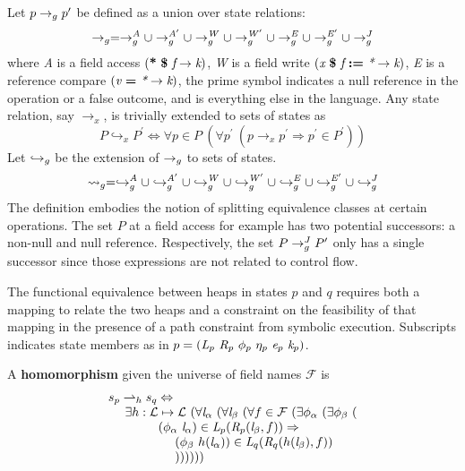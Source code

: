 Let $p \rightarrow_{g} p^\prime$ be defined as a union over state relations:
$$
\rightarrow_{g} = \rightarrow_{g}^\mathit{A} \cup  \rightarrow_{g}^\mathit{A^\prime} \cup \rightarrow_{g}^\mathit{W} \cup \rightarrow_{g}^\mathit{W^\prime} \cup \rightarrow_{g}^\mathit{E} \cup \rightarrow_{g}^\mathit{E^\prime} \cup \rightarrow_{g}^{J}
$$
where \emph{A} is a field access $\lp \cfgt{*}\ \cfgt{\$}\ \cfgnt{f}
\rightarrow \cfgnt{k}\rp$, \emph{W} is a field write $(
\emph{x}\ \textbf{\$}\ \emph{f}\ \textbf{:=}\ \emph{*} \rightarrow
\emph{k})$, \emph{E} is a reference compare $(
\emph{v}\ \textbf{=}\ \emph{*} \rightarrow \emph{k})$, the prime symbol
indicates a null reference in the operation or a false outcome, and
\emph{\com} is everything else in the language. Any state relation, say $\rightarrow_x$, is trivially extended to sets of states as
$$
P \hookrightarrow_x P^\prime \Longleftrightarrow \forall p \in P\ (\forall p^\prime\ (p \rightarrow_x p^\prime \Rightarrow p^\prime \in P^\prime))
$$
Let $\hookrightarrow_{g}$ be the extension of $\rightarrow_{g}$ to sets of states.
$$
\leadsto_{g} = \hookrightarrow_{g}^\mathit{A}
\cup \hookrightarrow_{g}^\mathit{A^\prime} \cup \hookrightarrow_{g}^\mathit{W} \cup
\hookrightarrow_{g}^\mathit{W^\prime} \cup \hookrightarrow_{g}^\mathit{E} \cup \hookrightarrow_{g}^\mathit{E^\prime}
\cup \hookrightarrow_{g}^{J}
$$
The definition embodies the notion of splitting equivalence classes at
certain operations. The set $P$ at a field access for example has two
potential successors: a non-null and null reference. Respectively, the
set $P \rightarrow_{g}^{J} P^\prime$ only has a single successor since those expressions
are not related to control flow.

The functional equivalence between heaps in states $p$
and $q$ requires both a mapping to relate the two heaps and a
constraint on the feasibility of that mapping in the presence of a
path constraint from symbolic execution. Subscripts indicates state
members as in $p = (
\emph{L}_p\ \emph{R}_p\ \phi_p\ \eta_p\ \emph{e}_p\ \emph{k}_p )$.
\begin{definition}
\label{def:homomorphism}
A \textbf{homomorphism} given the universe of field names $\mathcal{F}$ is 
$$
\begin{array}{l}
 s_p \rightharpoonup_{h} s_q \Leftrightarrow \\
\ \ \ \ \exists h: \mathcal{L} \mapsto \mathcal{L}\ (\forall \cfgnt{l}_\alpha\ (\forall \cfgnt{l}_\beta\ (\forall f \in \mathcal{F}\ ( \exists \phi_\alpha\ (\exists \phi_\beta\ ( \\ 
\ \ \ \ \ \ \ \ \ \ \ \ (\phi_\alpha\ \cfgnt{l}_\alpha) \in \cfgnt{L}_p(\cfgnt{R}_p (\cfgnt{l}_\beta,f )) \Rightarrow \\
\ \ \ \ \ \ \ \ \ \ \ \ \ \ \ \ (\phi_\beta\ h(\cfgnt{l}_\alpha))\in \cfgnt{L}_q(\cfgnt{R}_q (h(\cfgnt{l}_\beta),f ))\ \\
\ \ \ \ \ \ \ \ \ \ \ \ \ \ \ \  )) ) ) ) )
\end{array}
$$
\end{definition}

